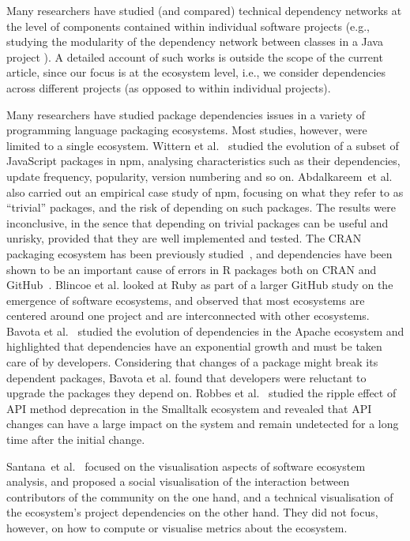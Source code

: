 \documentclass[smallextended]{svjour3}       %
\newcommand{\etal}{et al.\xspace}
\newcommand{\eg}{e.g.,\xspace}
\newcommand{\cran}{\textsf{CRAN}\xspace}
\newcommand{\npm}{\textsf{npm}\xspace}
\newcommand{\github}{\textsf{GitHub}\xspace}
\newcommand{\javascript}{\textsf{JavaScript}\xspace}
\newcommand{\ruby}{\textsf{Ruby}\xspace}
\newcommand{\R}{\textsf{R}\xspace}
\begin{document}
Many researchers have studied (and compared) technical dependency networks at the level of components contained within individual software projects (\eg studying the modularity of the dependency network between classes in a Java project \cite{Dietrich2008SoftVis,Zanetti2012ARCS}). A detailed account of such works is outside the scope of the current article, since our focus is at the ecosystem level, i.e., we consider dependencies across different projects (as opposed to within individual projects).

Many researchers have studied package dependencies issues in a variety of programming language packaging ecosystems. Most studies, however, were limited to a single ecosystem.
Wittern \etal~\cite{Wittern2016} studied the evolution of a subset of \javascript packages in \npm, analysing characteristics such as their dependencies, update frequency, popularity, version numbering and so on.
Abdalkareem~\etal~\cite{Abdalkareem2017ESECFSE} also carried out an empirical case study of \npm, focusing on what they refer to as ``trivial'' packages, and the risk of depending on such packages. The results were inconclusive, in the sence that depending on trivial packages can be useful and unrisky, provided that they are well implemented and tested.
The \cran packaging ecosystem has been previously studied~\cite{Hornik2012, GermanAdamsHassan2013,DecanMCG2015ecsa}, and dependencies have been shown to be an important cause of errors in \R packages both on \cran and \github~\cite{Decan2016SANER}.
Blincoe \etal \cite{Blincoe2015} looked at \ruby as part of a larger \github study on the emergence of software ecosystems, and observed that most ecosystems are centered around one project and are interconnected with other ecosystems. 
Bavota \etal~\cite{Bavota2015} studied the evolution of dependencies in the \textsf{Apache} ecosystem and highlighted that dependencies have an exponential growth and must be taken care of by developers. 
Considering that changes of a package might break its dependent packages, Bavota \etal found that developers were reluctant to upgrade the packages they depend on.
Robbes \etal~\cite{Robbes2012-smalltalkecos} studied the ripple effect of API method deprecation in the \textsf{Smalltalk} ecosystem and revealed that API changes can have a large impact on the system and remain undetected for a long time after the initial change.

Santana~\etal~\cite{Santana2013IWSECO} focused on the visualisation aspects of software ecosystem analysis, and proposed a social visualisation of the  interaction between contributors of the community on the one hand, and a technical visualisation of the ecosystem's project dependencies on the other hand. They did not focus, however, on how to compute or visualise metrics about the ecosystem.
\end{document}

